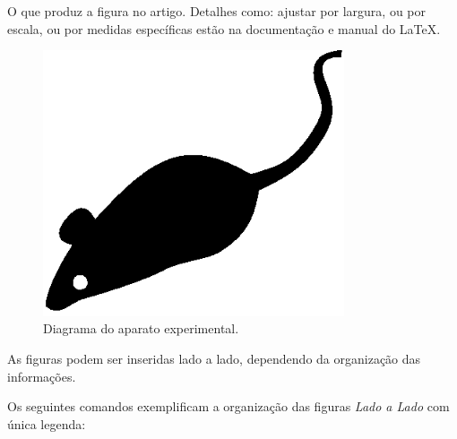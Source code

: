 \documentclass[12pt,A4,A4pt]{article}
\begin{document}
O que produz a figura no artigo. Detalhes como: ajustar por largura, ou por escala, ou por medidas específicas estão na documentação e manual do \LaTeX.

\begin{figure}[t]
\centering
\includegraphics[width=21pc]{mouse}
\caption{\fontsize{10pt}{\baselineskip}\selectfont Diagrama do aparato experimental.}
\label{fig_env1}
\end{figure}

As figuras podem ser inseridas lado a lado, dependendo da organização das informações.

Os seguintes comandos exemplificam a organização das figuras \textit{Lado a Lado} com única legenda:
\end{document}
